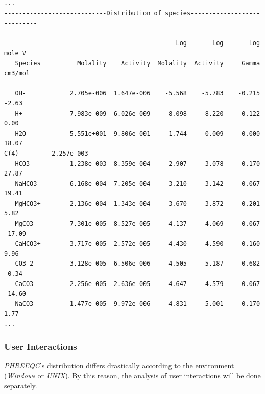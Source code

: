 \documentclass[ppgc,mestrado,English]{iiufrgs}
\begin{document}
\begin{minipage}[c]{0.93\textwidth}
\begin{lstlisting}[frame=single, caption=\emph{PHREEQC}'s excerpt from the output file, label=phreeqc:output]
...
----------------------------Distribution of species----------------------------
 
                                               Log       Log       Log    mole V
   Species          Molality    Activity  Molality  Activity     Gamma   cm3/mol
 
   OH-            2.705e-006  1.647e-006    -5.568    -5.783    -0.215     -2.63
   H+             7.983e-009  6.026e-009    -8.098    -8.220    -0.122      0.00
   H2O            5.551e+001  9.806e-001     1.744    -0.009     0.000     18.07
C(4)         2.257e-003
   HCO3-          1.238e-003  8.359e-004    -2.907    -3.078    -0.170     27.87
   NaHCO3         6.168e-004  7.205e-004    -3.210    -3.142     0.067     19.41
   MgHCO3+        2.136e-004  1.343e-004    -3.670    -3.872    -0.201      5.82
   MgCO3          7.301e-005  8.527e-005    -4.137    -4.069     0.067    -17.09
   CaHCO3+        3.717e-005  2.572e-005    -4.430    -4.590    -0.160      9.96
   CO3-2          3.128e-005  6.506e-006    -4.505    -5.187    -0.682     -0.34
   CaCO3          2.256e-005  2.636e-005    -4.647    -4.579     0.067    -14.60
   NaCO3-         1.477e-005  9.972e-006    -4.831    -5.001    -0.170      1.77
...
\end{lstlisting}
\end{minipage}

\subsubsection{User Interactions}
\emph{PHREEQC}'s distribution differs drastically according to the environment (\emph{Windows} or \emph{UNIX}). By this reason, the analysis of user interactions will be done separately.
\end{document}
